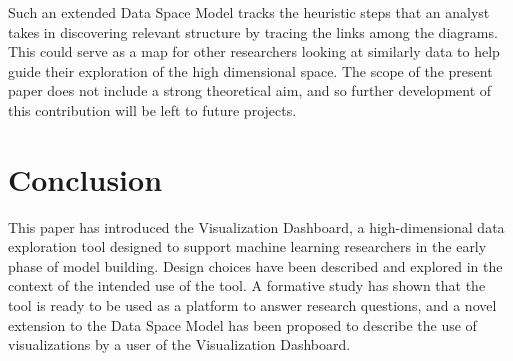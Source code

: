 \documentclass{sigchi}
\begin{document}
Such an extended Data Space Model tracks the heuristic steps that an analyst takes in discovering relevant structure by tracing the links among the diagrams. %
%
This could serve as a map for other researchers looking at similarly data to help guide their exploration of the high dimensional space. %
%
The scope of the present paper does not include a strong theoretical aim, and so further development of this contribution will be left to future projects. %
%
\section{Conclusion}%
This paper has introduced the Visualization Dashboard, a high-dimensional data exploration tool designed to support machine learning researchers in the early phase of model building. Design choices have been described and explored in the context of the intended use of the tool. A formative study has shown that the tool is ready to be used as a platform to answer research questions, and a novel extension to the Data Space Model has been proposed to describe the use of visualizations by a user of the Visualization Dashboard.
%



\end{document}
